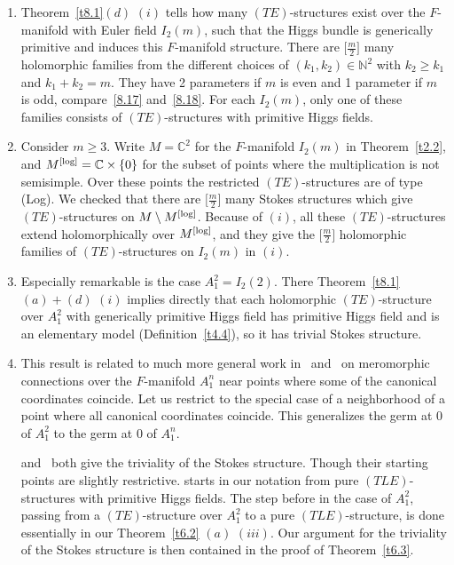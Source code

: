 \documentclass[pdftex]{sigma}%
\numberwithin{equation}{section}
\numberwithin{figure}{section}
\newcommand{\N}{{\mathbb N}}
\newcommand{\C}{{\mathbb C}}
\begin{document}
\begin{Remarks}\label{t8.8}\quad

\begin{enumerate}\itemsep=0pt
\item[$(i)$] Theorem~\ref{t8.1}$(d)$ $(i)$ tells how many $(TE)$-structures
exist over the $F$-manifold with \mbox{Euler} field $I_2(m)$,
such that the Higgs bundle is generically primitive
and induces this $F$-manifold structure.
There are $\big[\frac{m}{2}\big]$ many holomorphic families
from the different choices of $(k_1,k_2)\allowbreak\in\N^2$ with
$k_2\geq k_1$ and $k_1+k_2=m$.
They have 2 parameters if $m$ is even and 1 parameter
if $m$ is odd, compare~\eqref{8.17} and~\eqref{8.18}.
For each $I_2(m)$, only one of these families consists
of $(TE)$-structures with primitive Higgs fields.

\item[$(ii)$] Consider $m\geq 3$.
Write $M=\C^2$ for the $F$-manifold $I_2(m)$
in Theorem~\ref{t2.2}, and $M^{\rm [log]}=\C\times\{0\}$
for the subset of points where the multiplication
is not semisimple. Over these points the restricted
$(TE)$-structures are of type (Log).
We checked that there are $\big[\frac{m}{2}\big]$ many Stokes
structures which give $(TE)$-structures on $M\setminus M^{\rm [log]}$.
Because of $(i)$, all these $(TE)$-structures extend
holomorphically over $M^{\rm [log]}$, and they give the
$\big[\frac{m}{2}\big]$ holomorphic families of $(TE)$-structures
on $I_2(m)$ in $(i)$.

\item[$(iii)$] Especially remarkable is the case $A_1^2=I_2(2)$.
There Theorem~\ref{t8.1}$(a){+}(d)$ $(i)$ implies directly that
each holomorphic $(TE)$-structure over $A_1^2$
with generically primitive Higgs field has primitive
Higgs field and is an elementary model (Definition~\ref{t4.4}),
so it has trivial Stokes structure.

\item[$(iv)$] This result is related to much more general work
in~\cite{CDG17} and~\cite{Sa19}
on meromorphic connections over the $F$-manifold
$A_1^n$ near points where some of the canonical
coordinates coincide.
Let us restrict to the special case of a neighborhood
of a point where all canonical coordinates coincide.
This generalizes the germ at 0 of $A_1^2$ to the germ at 0
of $A_1^n$.

\cite[Theorem~1.1]{CDG17} and~\cite[Theorem~3]{Sa19}
both give the triviality of the Stokes structure.
Though their starting points are slightly restrictive.
\cite{CDG17} starts in our notation from pure
$(TLE)$-structures with primitive Higgs fields.
The step before in the case of $A_1^2$,
passing from a $(TE)$-structure over $A_1^2$ to a pure
$(TLE)$-structure, is done essentially in our Theorem~\ref{t6.2} $(a)$ $(iii)$.
Our argument for the triviality of the Stokes structure
is then contained in the proof of Theorem~\ref{t6.3}.


\end{enumerate}
\end{Remarks}
\end{document}
